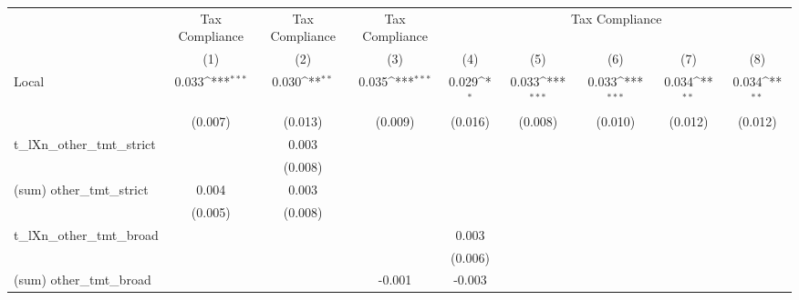 {
\def\sym#1{\ifmmode^{#1}\else\(^{#1}\)\fi}
\begin{tabular}{l*{8}{c}}
\hline\hline
                &\multicolumn{1}{c}{Tax Compliance}&\multicolumn{1}{c}{Tax Compliance}&\multicolumn{1}{c}{Tax Compliance}&\multicolumn{5}{c}{Tax Compliance}                                                            \\
                &\multicolumn{1}{c}{(1)}         &\multicolumn{1}{c}{(2)}         &\multicolumn{1}{c}{(3)}         &\multicolumn{1}{c}{(4)}         &\multicolumn{1}{c}{(5)}         &\multicolumn{1}{c}{(6)}         &\multicolumn{1}{c}{(7)}         &\multicolumn{1}{c}{(8)}         \\
\hline
Local           &    0.033\sym{***}&    0.030\sym{**} &    0.035\sym{***}&    0.029\sym{*}  &    0.033\sym{***}&    0.033\sym{***}&    0.034\sym{**} &    0.034\sym{**} \\
                &  (0.007)         &  (0.013)         &  (0.009)         &  (0.016)         &  (0.008)         &  (0.010)         &  (0.012)         &  (0.012)         \\
t\_lXn\_other\_tmt\_strict&                  &    0.003         &                  &                  &                  &                  &                  &                  \\
                &                  &  (0.008)         &                  &                  &                  &                  &                  &                  \\
(sum) other\_tmt\_strict&    0.004         &    0.003         &                  &                  &                  &                  &                  &                  \\
                &  (0.005)         &  (0.008)         &                  &                  &                  &                  &                  &                  \\
t\_lXn\_other\_tmt\_broad&                  &                  &                  &    0.003         &                  &                  &                  &                  \\
                &                  &                  &                  &  (0.006)         &                  &                  &                  &                  \\
(sum) other\_tmt\_broad&                  &                  &   -0.001         &   -0.003         &                  &                  &                  &                  \\

\end{tabular}}
